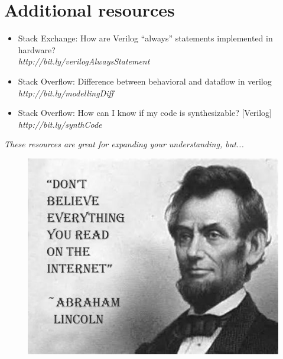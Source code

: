 \documentclass[a4paper,10pt]{article}
\theoremstyle{mytheor}
\begin{document}
\section*{Additional resources}
\begin{itemize}
  \small 
\item Stack Exchange: How are Verilog “always” statements implemented
  in hardware? \\\textit{http://bit.ly/verilogAlwaysStatement}
\item Stack Overflow: Difference between behavioral and dataflow in
  verilog \\\textit{http://bit.ly/modellingDiff}
\item Stack Overflow: How can I know if my code is synthesizable?
  [Verilog] \\\textit{http://bit.ly/synthCode}
\end{itemize} 

\centerline{\textit{These resources are great for expanding your
    understanding, but...}}
\begin{centering}
  \begin{figure}[!h] \centering  
    \includegraphics[width=0.5\linewidth]{./resources/meme.jpeg} 
  \end{figure}  
\end{centering}
\end{document}
